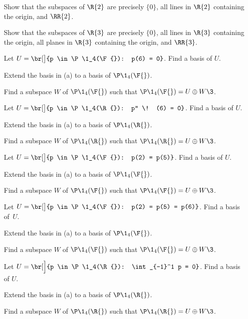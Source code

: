 
\exercise
Show that the subspaces of $\R{2}$ are precisely $\{0\}$, all lines in $\R{2}$ containing the origin, and $\RR{2}$.


\exercise
Show that the subspaces of $\R{3}$ are precisely $\{0\}$, all lines in $\R{3}$ containing the origin, all planes in $\R{3}$ containing the origin, and $\RR{3}$.


\exercise
\begin{SUBtheorem}
\item
Let $U = \br[\big]{p \in \P\1_4(\F{}): p(6) = 0}$. Find a basis of $U$.
\item
Extend the basis in (a) to a basis of $\P\1_4(\F{})$.
\item
Find a subspace $W$ of $\P\1_4(\F{})$ such that $\P\1_4(\F{}) = U \oplus W\3$.
\end{SUBtheorem}


\exercise
\begin{SUBtheorem}
\item
Let $U = \br[\big]{p \in \P\1_4(\R{}): p'' \! (6) = 0}$. Find a basis of $U$.
\item
Extend the basis in (a) to a basis of $\P\1_4(\R{})$.
\item
Find a subspace $W$ of $\P\1_4(\R{})$ such that $\P\1_4(\R{}) = U \oplus W\3$.
\end{SUBtheorem}


\exercise \label{2basis}
\begin{SUBtheorem}
\item
Let $U = \br[\big]{p \in \P\1_4(\F{}): p(2) = p(5)}$. Find a basis of $U$.
\item
Extend the basis in (a) to a basis of $\P\1_4(\F{})$.
\item
Find a subspace $W$ of $\P\1_4(\F{})$ such that $\P\1_4(\F{}) = U \oplus W\3$.
\end{SUBtheorem}


\exercise
\begin{SUBtheorem}
\item
Let $U = \br[\big]{p \in \P\1_4(\F{}): p(2) = p(5) = p(6)}$. Find a basis of~$U$.
\item
Extend the basis in (a) to a basis of $\P\1_4(\F{})$.
\item
Find a subspace $W$ of $\P\1_4(\F{})$ such that $\P\1_4(\F{}) = U \oplus W\3$.
\end{SUBtheorem}


\exercise
\begin{SUBtheorem}
\item
Let $U = \br[\Big]{p \in \P\1_4(\R{}): \int_{-1}^1 p = 0}$. Find a basis of $U$.
\item
Extend the basis in (a) to a basis of $\P\1_4(\R{})$.
\item
Find a subspace $W$ of $\P\1_4(\R{})$ such that $\P\1_4(\R{}) = U \oplus W\3$.
\end{SUBtheorem}



